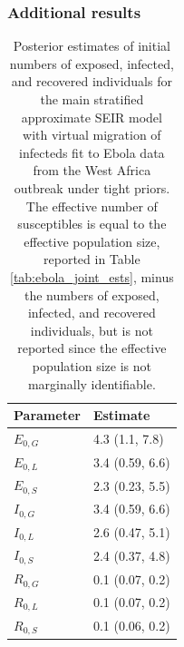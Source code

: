 \subsubsection{Additional results}
\label{subsubsec:ebola_joint_supp_res}

\begin{table}[htbp]
	\caption[Posterior estimates of initial numbers of exposed, infected, and recovered individuals for a stratified SEIR model fit to Ebola outbreak data.]{Posterior estimates of initial numbers of exposed, infected, and recovered individuals for the main stratified approximate SEIR model with virtual migration of infecteds fit to Ebola data from the West Africa outbreak under tight priors. The effective number of susceptibles is equal to the effective population size, reported in Table \ref{tab:ebola_joint_ests}, minus the numbers of exposed, infected, and recovered individuals, but is not reported since the effective population size is not marginally identifiable.}
	\label{tab:ebola_joint_initdist_res}
	\centering
	\begin{tabular}{ll}
		\hline
		\textbf{Parameter} & \textbf{Estimate }\\ 
		\hline
		$ E_{0,G} $&  4.3 (1.1, 7.8) \\ 
		$ E_{0,L} $&  3.4 (0.59, 6.6) \\ 
		$ E_{0,S} $&  2.3 (0.23, 5.5) \\ 
		$ I_{0,G} $& 3.4 (0.59, 6.6) \\ 
		$ I_{0,L} $&  2.6 (0.47, 5.1) \\ 
		$ I_{0,S} $& 2.4 (0.37, 4.8) \\ 
		$ R_{0,G} $& 0.1 (0.07, 0.2) \\ 
		$ R_{0,L} $&  0.1 (0.07, 0.2) \\ 
		$ R_{0,S} $&  0.1 (0.06, 0.2) \\ 
		\hline
	\end{tabular}
\end{table}

